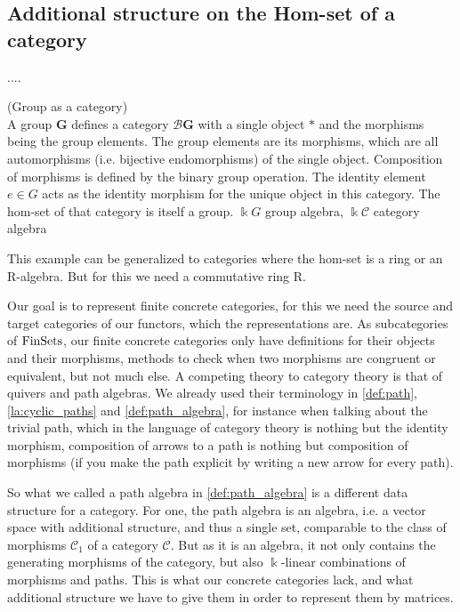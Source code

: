 
\subsection{Additional structure on the Hom-set of a category}

....

\begin{example}{(Group as a category)}\\
\noindent A group $\mathbf{G}$ defines a category $\mathcal{B}\mathbf{G}$ with a single object $\ast$ and the morphisms being the group elements. The group elements are its morphisms, which are
all automorphisms (i.e. bijective endomorphisms) of the single object. Composition of morphisms is defined by the binary group operation.
The identity element $e \in G$ acts as the identity morphism for the unique object in this category. The hom-set of that category is itself
a group.
$\Bbbk G$ group algebra, $\Bbbk \mathcal{C}$ category algebra
\end{example}

This example can be generalized to categories where the hom-set is a ring or an R-algebra. But for this we need a commutative ring R.

Our goal is to represent finite concrete categories, for this we need the source and target categories of our functors, which the
representations are.
As subcategories of $\textup{FinSets}$, our finite concrete categories only have definitions for their objects and their
morphisms, methods to check when two morphisms are congruent or equivalent, but not much else.
A competing theory to category theory is that of quivers and path algebras. We already used their terminology in
\ref{def:path}, \ref{la:cyclic_paths} and \ref{def:path_algebra}, for instance when talking about the trivial path,
which in the language of category theory is nothing but the identity morphism, composition of arrows to a path is nothing but
composition of morphisms (if you make the path explicit by writing a new arrow for every path).

So what we called a path algebra in \ref{def:path_algebra} is a different data structure for a category. 
For one, the path algebra is an algebra, i.e. a vector space with additional structure, and thus a single set, comparable to the
class of morphisms $\mathcal{C}_{1}$ of a category $\mathcal{C}$.
But as it is an algebra, it not only contains the generating morphisms of the category, but also $\Bbbk$-linear combinations of
morphisms and paths. This is what our concrete categories lack, and what additional structure we have to give them in order
to represent them by matrices.

